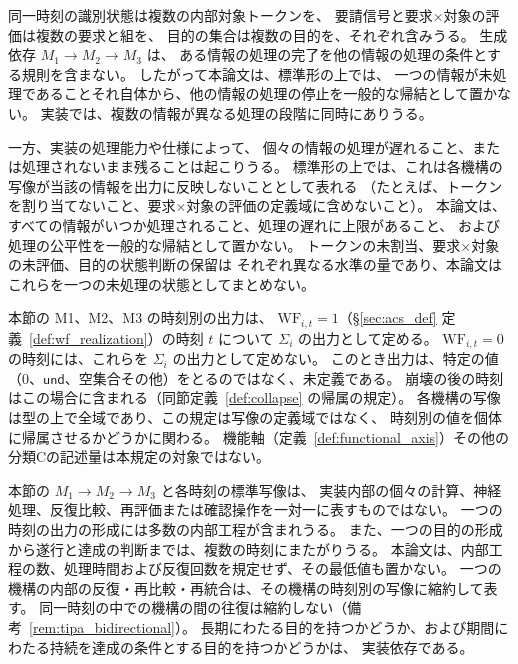 \begin{remark}[複数の情報の並行的な処理の範囲]
\label{rem:multi_item_concurrency}
同一時刻の識別状態は複数の内部対象トークンを、
要請信号と要求×対象の評価は複数の要求と組を、
目的の集合は複数の目的を、それぞれ含みうる。
生成依存 $M_1\to M_2\to M_3$ は、
ある情報の処理の完了を他の情報の処理の条件とする規則を含まない。
したがって本論文は、標準形の上では、
一つの情報が未処理であることそれ自体から、他の情報の処理の停止を一般的な帰結として置かない。
実装では、複数の情報が異なる処理の段階に同時にありうる。

一方、実装の処理能力や仕様によって、
個々の情報の処理が遅れること、または処理されないまま残ることは起こりうる。
標準形の上では、これは各機構の写像が当該の情報を出力に反映しないこととして表れる
（たとえば、トークンを割り当てないこと、要求×対象の評価の定義域に含めないこと）。
本論文は、すべての情報がいつか処理されること、処理の遅れに上限があること、
および処理の公平性を一般的な帰結として置かない。
トークンの未割当、要求×対象の未評価、目的の状態判断の保留は
それぞれ異なる水準の量であり、本論文はこれらを一つの未処理の状態としてまとめない。
\end{remark}

\begin{definition}
\label{def:s4_output_attribution}
本節の M1、M2、M3 の時刻別の出力は、
$\mathrm{WF}_{i,t}=1$（\S\ref{sec:acs_def} 定義~\ref{def:wf_realization}）の時刻 $t$ について
$\Sigma_i$ の出力として定める。
$\mathrm{WF}_{i,t}=0$ の時刻には、これらを $\Sigma_i$ の出力として定めない。
このとき出力は、特定の値（$0$、$\mathsf{und}$、空集合その他）をとるのではなく、未定義である。
崩壊の後の時刻はこの場合に含まれる（同節定義~\ref{def:collapse} の帰属の規定）。
各機構の写像は型の上で全域であり、この規定は写像の定義域ではなく、
時刻別の値を個体に帰属させるかどうかに関わる。
機能軸（定義~\ref{def:functional_axis}）その他の分類Cの記述量は本規定の対象ではない。
\end{definition}

\begin{remark}[離散時刻と内部処理工程]
\label{rem:internal_steps_time}
本節の $M_1\to M_2\to M_3$ と各時刻の標準写像は、
実装内部の個々の計算、神経処理、反復比較、再評価または確認操作を一対一に表すものではない。
一つの時刻の出力の形成には多数の内部工程が含まれうる。
また、一つの目的の形成から遂行と達成の判断までは、複数の時刻にまたがりうる。
本論文は、内部工程の数、処理時間および反復回数を規定せず、その最低値も置かない。
一つの機構の内部の反復・再比較・再統合は、その機構の時刻別の写像に縮約して表す。
同一時刻の中での機構の間の往復は縮約しない（備考~\ref{rem:tipa_bidirectional}）。
長期にわたる目的を持つかどうか、および期間にわたる持続を達成の条件とする目的を持つかどうかは、
実装依存である。
\end{remark}


